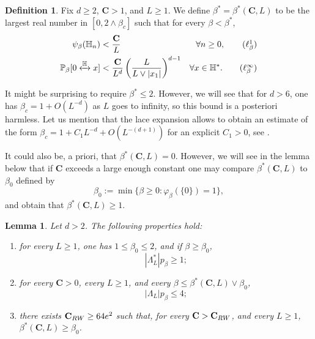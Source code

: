 \documentclass[11pt,a4paper]{article}
\numberwithin{equation}{section}
\theoremstyle{plain}
\newtheorem{Lem}[Thm]{Lemma}
\theoremstyle{definition}
\newtheorem{Def}[Thm]{Definition}
\newcommand\bfC{\mathbf{C}}
\newcommand{\connect}{\xleftrightarrow}
\begin{document}
\begin{Def} Fix $d\geq 2$, $\bfC>1$, and $L\geq 1$. We define $\beta^*=\beta^*(\bfC,L)$ to be the largest real number in  $[0,2\wedge\beta_c]$ such that for every $\beta<\beta^*$, 
\begin{align}%
\psi_\beta(\mathbb H_n)&< \frac{\bfC}{L} &\forall n\ge0,\label{eq:H_beta perco}\tag{$\ell^1_\beta$}
\\
 \mathbb P_{\beta}[0\connect{\mathbb H\:}x]&<\frac{\bfC}{L^d}\left(\frac{L}{L\vee |x_1|}\right)^{d-1} &\forall x\in\mathbb H^*.\label{eq:H_beta-' perco}\tag{$\ell^\infty_\beta$}
\end{align}
\end{Def}
It might be surprising to require $\beta^*\leq 2$. However, we will see that for $d>6$, one has $\beta_c= 1+O(L^{-d})$ as $L$ goes to infinity, so this bound is a posteriori harmless. Let us mention that the lace expansion allows to obtain an estimate of the form $\beta_c=1+C_1L^{-d}+O(L^{-(d+1)})$ for an explicit $C_1>0$, see \cite{vdHofstadSakai2005CriticalPoints}.

It could also be, a priori, that $\beta^*(\bfC,L)=0$. However, we will see in the lemma below that if $\bfC$ exceeds a large enough constant one may compare $\beta^*(\bfC,L)$ to $\beta_0$ defined by 
\begin{equation}\label{eq: def beta_0}
	\beta_0:=\min\{\beta\geq 0: \varphi_{\beta}(\{0\})=1\},
\end{equation}
and obtain that $\beta^*(\bfC,L)\ge1$.

\begin{Lem}\label{lem: intro lem about betastar} Let $d>2$. The following properties hold: 
\begin{enumerate}
	\item[$(i)$] for every $L\geq 1$, one has $1\leq \beta_0\leq 2$, and if $\beta \geq \beta_0$,
	\begin{equation}\label{eq: full volume times p}
	|\Lambda_L^*|p_\beta\geq 1;
\end{equation}
	\item[$(ii)$] for every $\bfC>0$, every $L\geq 1$, and every $\beta\leq \beta^*(\bfC,L)\vee \beta_0$,
	\begin{equation}\label{eq: bound volume times p}
	|\Lambda_L|p_{\beta}\leq 4;
\end{equation}
	\item[$(iii)$] there exists $\bfC_{\rm RW}\geq 64e^2$ such that, for every $\bfC>\mathbf C_{\rm RW}$, and every $L\geq 1$, $\beta^*(\bfC,L)\geq \beta_0$.
\end{enumerate}
 \end{Lem}
\end{document}
